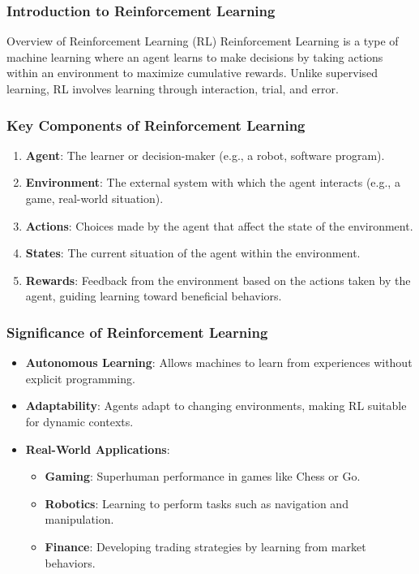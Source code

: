 \documentclass[aspectratio=169]{beamer}
\begin{document}
\frame{\titlepage}

\begin{frame}[fragile]
    \frametitle{Introduction to Reinforcement Learning}
    \begin{block}{Overview of Reinforcement Learning (RL)}
        Reinforcement Learning is a type of machine learning where an agent learns to make decisions by taking actions within an environment to maximize cumulative rewards. Unlike supervised learning, RL involves learning through interaction, trial, and error.
    \end{block}
\end{frame}

\begin{frame}[fragile]
    \frametitle{Key Components of Reinforcement Learning}
    \begin{enumerate}
        \item \textbf{Agent}: The learner or decision-maker (e.g., a robot, software program).
        \item \textbf{Environment}: The external system with which the agent interacts (e.g., a game, real-world situation).
        \item \textbf{Actions}: Choices made by the agent that affect the state of the environment.
        \item \textbf{States}: The current situation of the agent within the environment.
        \item \textbf{Rewards}: Feedback from the environment based on the actions taken by the agent, guiding learning toward beneficial behaviors.
    \end{enumerate}
\end{frame}

\begin{frame}[fragile]
    \frametitle{Significance of Reinforcement Learning}
    \begin{itemize}
        \item \textbf{Autonomous Learning}: Allows machines to learn from experiences without explicit programming.
        \item \textbf{Adaptability}: Agents adapt to changing environments, making RL suitable for dynamic contexts.
        \item \textbf{Real-World Applications}: 
        \begin{itemize}
            \item \textbf{Gaming}: Superhuman performance in games like Chess or Go.
            \item \textbf{Robotics}: Learning to perform tasks such as navigation and manipulation.
            \item \textbf{Finance}: Developing trading strategies by learning from market behaviors.
        \end{itemize}
    \end{itemize}
\end{frame}
\end{document}

